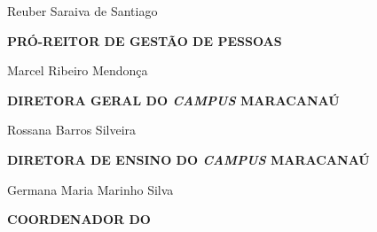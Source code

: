 \begin{center}

\noindent Reuber Saraiva de Santiago

\vspace{0,25cm}

\noindent\textbf{\MakeUppercase{Pró-Reitor de Gestão de Pessoas}}

\noindent Marcel Ribeiro Mendonça

\vspace{0,25cm}

\noindent\textbf{\MakeUppercase{Diretora Geral do \textit{Campus} Maracanaú}}


\noindent Rossana Barros Silveira

\vspace{0,25cm}

\noindent\textbf{\MakeUppercase{Diretora de Ensino do \textit{Campus} Maracanaú}}


\noindent Germana Maria Marinho Silva

\vspace{0,25cm}

\noindent\textbf{\MakeUppercase{Coordenador do \NOMECURSO}}


\noindent \COORDENADORCURSO
\null
\end{center}

\clearpage
\thispagestyle{empty}
\vspace{1cm}

